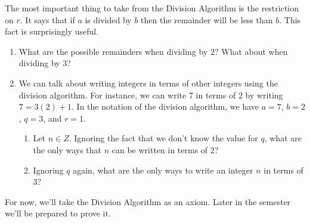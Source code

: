 \documentclass[12 pt]{article}
\theoremstyle{definition}
\theoremstyle{plain}
\theoremstyle{mytheorem}
\theoremstyle{myexample}
\theoremstyle{mydefinition}
\begin{document}
The most important thing to take from the Division Algorithm is the restriction on $r$.  It says that if $a$ is divided by $b$ then the remainder will be less than $b$.  This fact is surprisingly useful.\\

	\begin{enumerate}[resume]
	\item What are the possible remainders when dividing by $2$?  What about when dividing by $3$?
	\vspace{.75in}
	\item We can talk about writing integers in terms of other integers using the division algorithm.  For instance, we can write $7$ in terms of $2$ by writing $7=3(2)+1$.  In the notation of the division algorithm, we have $a=7$, $b=2$, $q=3$, and $r=1$.
		\begin{enumerate}[label=(\roman*)]
		\item Let $n \in Z$.  Ignoring the fact that we don't know the value for $q$, what are the only ways that $n$ can be written in terms of $2$?
		\vspace{.75in}
		\item Ignoring $q$ again, what are the only ways to write an integer $n$ in terms of $3$?
		\vspace{1in}
		\end{enumerate}
	\end{enumerate}

For now, we'll take the Division Algorithm as an axiom.  Later in the semester we'll be prepared to prove it.
\end{document}
